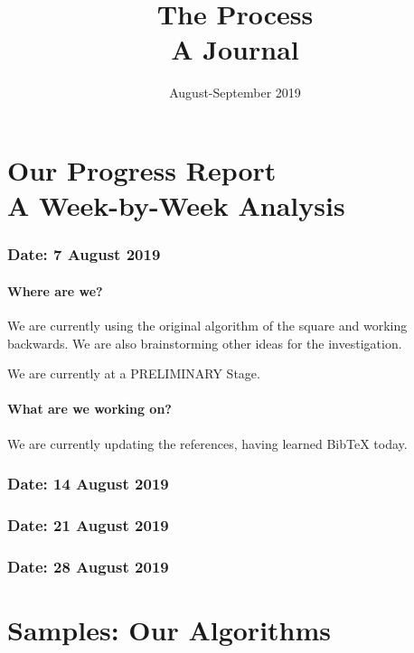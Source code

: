 \documentclass[a4paper,12pt,oneside]{book}
\title{%
  \Huge The Process \\
  \LARGE A Journal}
\date{\LARGE August-September 2019}
\begin{document}
\maketitle

\part{Our Progress Report\\
A Week-by-Week Analysis}

\section{Date: 7 August 2019}

\subsection{Where are we?}
We are currently using the original algorithm of the square and working backwards. We are also brainstorming other ideas for the investigation.
\subparagraph{We are currently at a PRELIMINARY Stage.}

\subsection{What are we working on?}
We are currently updating the references, having learned BibTeX today.

\newpage
\section{Date: 14 August 2019}

\newpage
\section{Date: 21 August 2019}

\newpage
\section{Date: 28 August 2019}

\part{Samples: Our Algorithms}
\end{document}
